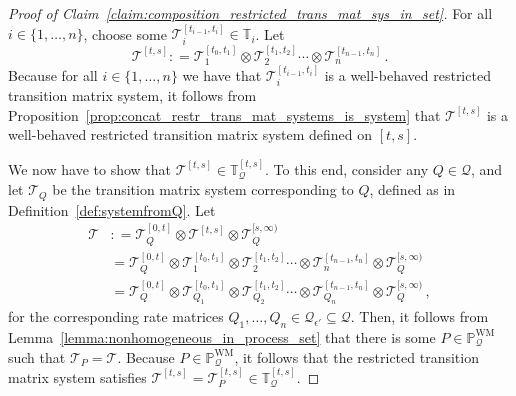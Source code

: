 \documentclass[10pt]{paper}
\theoremstyle{definition}
\newcommand{\processes}{\mathbb{P}}
\newcommand{\wmprocesses}{\processes^{\mathrm{WM}}}
\newcommand{\rateset}{\mathcal{Q}}
\newcommand{\coloneqq}{:\!=}
\begin{document}
\begin{proof}[Proof of Claim~\ref{claim:composition_restricted_trans_mat_sys_in_set}]
For all $i\in\{1,\ldots,n\}$, choose some $\mathcal{T}_i^{[t_{i-1},t_i]}\in\mathbb{T}_i$. Let
\begin{equation*}
\mathcal{T}^{[t,s]}\coloneqq \mathcal{T}_1^{[t_{0},t_1]} \otimes \mathcal{T}_2^{[t_{1},t_2]} \cdots \otimes \mathcal{T}_n^{[t_{n-1},t_n]}\,.
\end{equation*}
Because for all $i\in\{1,\ldots,n\}$ we have that $\mathcal{T}_i^{[t_{i-1},t_i]}$ is a well-behaved restricted transition matrix system, it follows from Proposition~\ref{prop:concat_restr_trans_mat_systems_is_system} that $\mathcal{T}^{[t,s]}$ is a well-behaved restricted transition matrix system defined on $[t,s]$.

We now have to show that $\mathcal{T}^{[t,s]} \in \mathbb{T}_\rateset^{[t,s]}$. To this end, consider any $Q\in\rateset$, and let $\mathcal{T}_Q$ be the transition matrix system corresponding to $Q$, defined as in Definition~\ref{def:systemfromQ}. Let
\begin{align*}
\mathcal{T} &\coloneqq \mathcal{T}_Q^{[0,t]}\otimes \mathcal{T}^{[t,s]} \otimes \mathcal{T}_Q^{[s,\infty)} \\
 &= \mathcal{T}_Q^{[0,t]}\otimes \mathcal{T}_1^{[t_{0},t_1]} \otimes \mathcal{T}_2^{[t_{1},t_2]} \cdots \otimes \mathcal{T}_n^{[t_{n-1},t_n]} \otimes \mathcal{T}_Q^{[s,\infty)} \\
 &= \mathcal{T}_Q^{[0,t]}\otimes \mathcal{T}_{Q_1}^{[t_{0},t_1]} \otimes \mathcal{T}_{Q_2}^{[t_{1},t_2]} \cdots \otimes \mathcal{T}_{Q_n}^{[t_{n-1},t_n]} \otimes \mathcal{T}_Q^{[s,\infty)} \,,
\end{align*}
for the corresponding rate matrices $Q_1,\ldots,Q_n\in\rateset_{\epsilon'}\subseteq\rateset$. Then, it follows from Lemma~\ref{lemma:nonhomogeneous_in_process_set} that there is some $P\in\wmprocesses_\rateset$ such that $\mathcal{T}_P=\mathcal{T}$. Because $P\in\wmprocesses_\rateset$, it follows that the restricted transition matrix system satisfies $\mathcal{T}^{[t,s]}=\mathcal{T}_P^{[t,s]}\in\mathbb{T}_\rateset^{[t,s]}$.
\end{proof}
\end{document}

